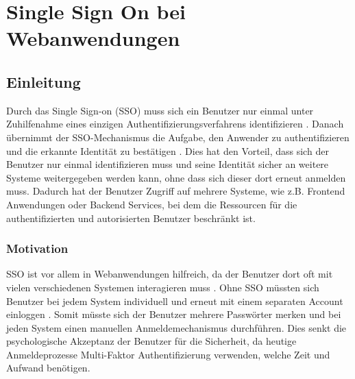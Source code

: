 

\chapter{Single Sign On bei Webanwendungen}




\section{Einleitung} \label{EB_Einleitung}

Durch das Single Sign-on (SSO) muss sich ein Benutzer nur einmal unter Zuhilfenahme eines einzigen Authentifizierungsverfahrens identifizieren \cite{EB52}. Danach übernimmt der SSO-Mechanismus die Aufgabe, den Anwender zu authentifizieren und die erkannte Identität zu bestätigen \cite{EB52}. Dies hat den Vorteil, dass sich der Benutzer nur einmal identifizieren muss und seine Identität sicher an weitere Systeme weitergegeben werden kann, ohne dass sich dieser dort erneut anmelden muss. Dadurch hat der Benutzer Zugriff auf mehrere Systeme, wie z.B. Frontend Anwendungen oder Backend Services, bei dem die Ressourcen für die authentifizierten und autorisierten Benutzer beschränkt ist.

\subsection{Motivation} %


SSO ist vor allem in Webanwendungen hilfreich, da der Benutzer dort oft mit vielen verschiedenen Systemen interagieren muss \cite{EB34}. Ohne SSO müssten sich Benutzer bei jedem System individuell und erneut mit einem separaten Account einloggen \cite{EB34}. Somit müsste sich der Benutzer mehrere Passwörter merken und bei jeden System einen manuellen Anmeldemechanismus durchführen. Dies senkt die psychologische Akzeptanz der Benutzer für die Sicherheit, da heutige Anmeldeprozesse Multi-Faktor Authentifizierung verwenden, welche Zeit und Aufwand benötigen.

